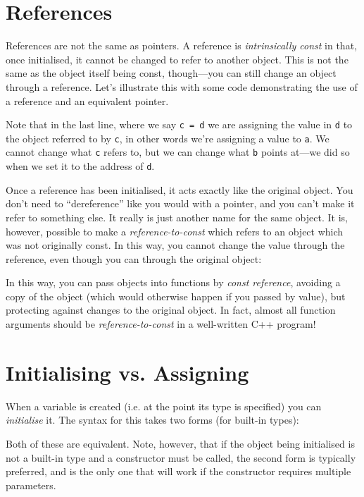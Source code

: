 \documentclass[a4paper]{scrartcl}
\begin{document}
\section{References}
References are not the same as pointers. A reference is \emph{intrinsically const} in that, once initialised, it cannot be changed to refer to another object. This is not the same as the object itself being const, though---you can still change an object through a reference. Let's illustrate this with some code demonstrating the use of a reference and an equivalent pointer.



Note that in the last line, where we say \verb|c = d| we are assigning the value in \verb|d| to the object referred to by \verb|c|, in other words we're assigning a value to \verb|a|. We cannot change what \verb|c| refers to, but we can change what \verb|b| points at---we did so when we set it to the address of \verb|d|.

Once a reference has been initialised, it acts exactly like the original object. You don't need to ``dereference'' like you would with a pointer, and you can't make it refer to something else. It really is just another name for the same object. It is, however, possible to make a \emph{reference-to-const} which refers to an object which was not originally const. In this way, you cannot change the value through the reference, even though you can through the original object:



In this way, you can pass objects into functions by \emph{const reference}, avoiding a copy of the object (which would otherwise happen if you passed by value), but protecting against changes to the original object. In fact, almost all function arguments should be \emph{reference-to-const} in a well-written C++ program!

\section{Initialising vs. Assigning}
When a variable is created (i.e. at the point its type is specified) you can \emph{initialise} it. The syntax for this takes two forms (for built-in types):



Both of these are equivalent. Note, however, that if the object being initialised is not a built-in type and a constructor must be called, the second form is typically preferred, and is the only one that will work if the constructor requires multiple parameters.
\end{document}
